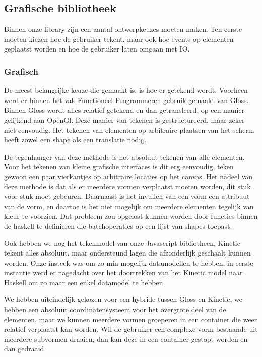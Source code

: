 \subsection{Grafische bibliotheek} \label{subsec:grafische_bibliotheek}

Binnen onze library zijn een aantal ontwerpkeuzes moeten maken. Ten eerste moeten kiezen hoe de gebruiker tekent, maar ook hoe events op elementen geplaatst worden en hoe de gebruiker laten omgaan met IO.

\subsubsection{Grafisch}
De meest belangrijke keuze die gemaakt is, is hoe er getekend wordt. Voorheen werd er binnen het vak Functioneel Programmeren gebruik gemaakt van Gloss. Binnen Gloss wordt alles relatief getekend en dan getransleerd, op een manier gelijkend aan OpenGl. Deze manier van tekenen is gestructureerd, maar zeker niet eenvoudig. Het tekenen van elementen op arbitraire plaatsen van het scherm heeft zowel een shape als een translatie nodig.

De tegenhanger van deze methode is het absoluut tekenen van alle elementen. Voor het tekenen van kleine grafische interfaces is dit erg eenvoudig, teken gewoon een paar vierkantjes op arbitraire locaties op het canvas. Het nadeel van deze methode is dat als er meerdere vormen verplaatst moeten worden, dit stuk voor stuk moet gebeuren. Daarnaast is het invullen van een vorm een attribuut van de vorm, en daartoe is het niet mogelijk om meerdere elementen tegelijk van kleur te voorzien. Dat probleem zou opgelost kunnen worden door functies binnen de haskell te definieren die batchoperaties op een lijst van shapes toepast.

Ook hebben we nog het tekenmodel van onze Javascript bibliotheen, Kinetic tekent alles absoluut, maar ondersteund lagen die afzonderlijk geschaalt kunnen worden. Onze insteek was om zo min mogelijk datamodellen te hebben, in eerste instantie werd er nagedacht over het doortrekken van het Kinetic model naar Haskell om zo maar een enkel datamodel te hebben.

We hebben uiteindelijk gekozen voor een hybride tussen Gloss en Kinetic, we hebben een absoluut coordinatensysteem voor het overgrote deel van de elementen, maar we kunnen meerdere vormen groeperen in een container die weer relatief verplaatst kan worden. Wil de gebruiker een complexe vorm bestaande uit meerdere subvormen draaien, dan kan deze in een container gestopt worden en dan gedraaid.

